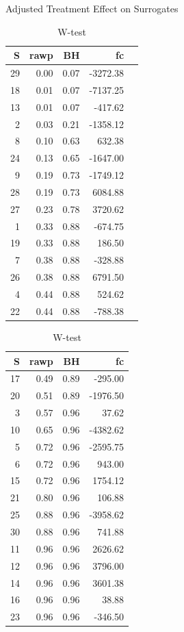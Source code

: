 \documentclass[a4paper,9pt]{beamer}\usepackage[]{graphicx}\usepackage[]{color}
\begin{document}
\begin{frame}{Adjusted Treatment Effect on Surrogates}
\begin{table}[H]
\centering
\begin{minipage}{0.5\textwidth}
\begin{tabular}{rrrrr}
  \hline
  S & rawp & BH & fc \\ 
  \hline
  29 & 0.00 & 0.07 & -3272.38 \\ 
  18 & 0.01 & 0.07 & -7137.25 \\ 
  13 & 0.01 & 0.07 & -417.62 \\ 
  2 & 0.03 & 0.21 & -1358.12 \\ 
  8 & 0.10 & 0.63 & 632.38 \\ 
  24 & 0.13 & 0.65 & -1647.00 \\ 
  9 & 0.19 & 0.73 & -1749.12 \\ 
  28 & 0.19 & 0.73 & 6084.88 \\ 
  27 & 0.23 & 0.78 & 3720.62 \\ 
  1 & 0.33 & 0.88 & -674.75 \\ 
  19 & 0.33 & 0.88 & 186.50 \\ 
  7 & 0.38 & 0.88 & -328.88 \\ 
  26 & 0.38 & 0.88 & 6791.50 \\ 
  4 & 0.44 & 0.88 & 524.62 \\ 
  22 & 0.44 & 0.88 & -788.38 \\ 
  \hline
  \end{tabular}
\end{minipage}\hfill
\begin{minipage}{0.4\textwidth}
\begin{tabular}{rrrr}
\hline
S & rawp & BH & fc \\ 
  \hline
  17 & 0.49 & 0.89 & -295.00 \\ 
  20 & 0.51 & 0.89 & -1976.50 \\ 
  3 & 0.57 & 0.96 & 37.62 \\ 
  10 & 0.65 & 0.96 & -4382.62 \\ 
  5 & 0.72 & 0.96 & -2595.75 \\ 
  6 & 0.72 & 0.96 & 943.00 \\ 
  15 & 0.72 & 0.96 & 1754.12 \\ 
  21 & 0.80 & 0.96 & 106.88 \\ 
  25 & 0.88 & 0.96 & -3958.62 \\ 
  30 & 0.88 & 0.96 & 741.88 \\ 
  11 & 0.96 & 0.96 & 2626.62 \\ 
  12 & 0.96 & 0.96 & 3796.00 \\ 
  14 & 0.96 & 0.96 & 3601.38 \\ 
  16 & 0.96 & 0.96 & 38.88 \\ 
  23 & 0.96 & 0.96 & -346.50 \\ 
   \hline
\end{tabular}
\end{minipage}
\caption{W-test} 
\end{table}

\end{frame}
\end{document}
